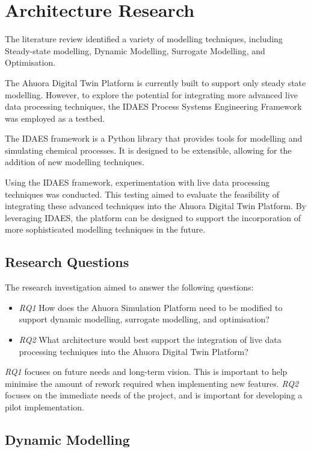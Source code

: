 \documentclass[12pt]{report}
\begin{document}
\chapter{Architecture Research}

The literature review identified a variety of modelling techniques, including Steady-state modelling, Dynamic Modelling, Surrogate Modelling, and Optimisation. 

The Ahuora Digital Twin Platform is currently built to support only steady state modelling. However, to explore the potential for integrating more advanced live data processing techniques, the IDAES Process Systems Engineering Framework was employed as a testbed.

The IDAES framework is a Python library that provides tools for modelling and simulating chemical processes. It is designed to be extensible, allowing for the addition of new modelling techniques.

Using the IDAES framework, experimentation with live data processing techniques was conducted. This testing aimed to evaluate the feasibility of integrating these advanced techniques into the Ahuora Digital Twin Platform. By leveraging IDAES, the platform can be designed to support the incorporation of more sophisticated modelling techniques in the future.

\section{Research Questions}

The research investigation aimed to answer the following questions:

\begin{itemize}
    \item \textit{RQ1} How does the Ahuora Simulation Platform need to be modified to support dynamic modelling, surrogate modelling, and optimisation?
    \item \textit{RQ2} What architecture would best support the integration of live data processing techniques into the Ahuora Digital Twin Platform?
\end{itemize}

\textit{RQ1} focuses on future needs and long-term vision. This is important to help minimise the amount of rework required when implementing new features. \textit{RQ2} focuses on the immediate needs of the project, and is important for developing a pilot implementation.

\section{Dynamic Modelling}
\end{document}
